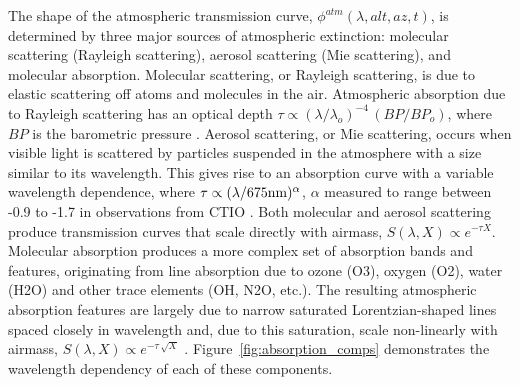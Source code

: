 \documentclass[12pt,preprint]{aastex}
\begin{document}
The shape of the atmospheric transmission curve, $\phi^{atm}(\lambda,
alt, az, t)$, is determined by three major sources of atmospheric
extinction: molecular scattering (Rayleigh scattering), aerosol
scattering (Mie scattering), and molecular absorption. Molecular
scattering, or Rayleigh scattering, is due to elastic scattering off
atoms and molecules in the air. Atmospheric absorption due to Rayleigh
scattering has an optical depth $\tau \propto (\lambda/
\lambda_o)^{-4}\, (BP/BP_o)$, where $BP$ is the barometric pressure
\citep{Hansen1974}.  Aerosol scattering, or Mie scattering, occurs
when visible light is scattered by particles suspended in the
atmosphere with a size similar to its wavelength.  This gives rise to
an absorption curve with a variable wavelength dependence, where $\tau
\propto (\lambda/675 \rm{nm})^{\alpha}$, $\alpha$ measured to range
between -0.9 to -1.7 in observations from CTIO
\citep{Burke2010b}. Both molecular and aerosol scattering produce
transmission curves that scale directly with airmass, $S(\lambda, X)
\propto e^{-\tau X}$.  Molecular absorption produces a more complex
set of absorption bands and features, originating from line absorption
due to ozone (O3), oxygen (O2), water (H2O) and other trace elements
(OH, N2O, etc.). The resulting atmospheric absorption features are largely due
to narrow saturated Lorentzian-shaped lines spaced closely in
wavelength and, due to this saturation, scale non-linearly with airmass,
$S(\lambda, X) \propto e^{-\tau\,\sqrt X}$
\citep{Stubbs2007b}. Figure~\ref{fig:absorption_comps} demonstrates the
wavelength dependency of each of these components.
\end{document}
